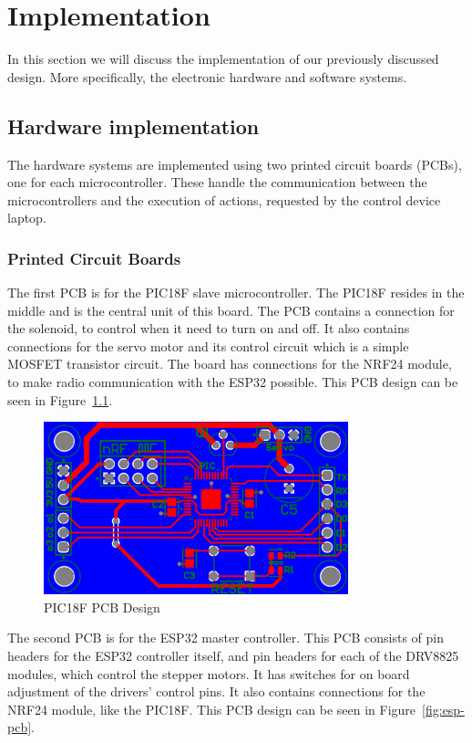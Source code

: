 \chapter{Implementation}
In this section we will discuss the implementation of our previously discussed design. More specifically, the electronic hardware and software systems.

\section{Hardware implementation}
The hardware systems are implemented using two printed circuit boards (PCBs), one for each microcontroller. These handle the communication between the microcontrollers and the execution of actions, requested by the control device laptop.

\subsection{Printed Circuit Boards}

The first PCB is for the PIC18F slave microcontroller. The PIC18F resides in the middle and is the central unit of this board. The PCB contains a connection for the solenoid, to control when it need to turn on and off. It also contains connections for the servo motor and its control circuit which is a simple MOSFET transistor circuit. The board has connections for the NRF24 module, to make radio communication with the ESP32 possible. This PCB design can be seen in Figure~\ref{fig:pic-pcb}.

\begin{figure}[h]
	\centering\includegraphics[height=5cm]{./images/PIC18F_pcb}
	\caption{PIC18F PCB Design}
	\label{fig:pic-pcb}
\end{figure}

The second PCB is for the ESP32 master controller. This PCB consists of pin headers for the ESP32 controller itself, and pin headers for each of the DRV8825 modules, which control the stepper motors. It has switches for on board adjustment of the drivers' control pins. It also contains connections for the NRF24 module, like the PIC18F. This PCB design can be seen in Figure~\ref{fig:esp-pcb}. 


